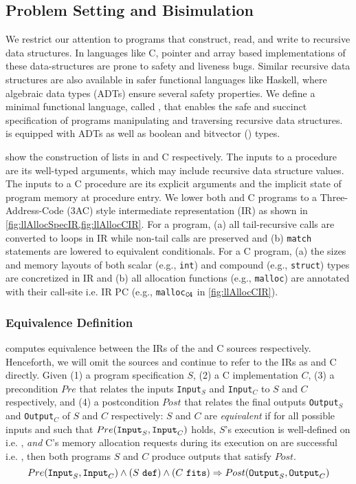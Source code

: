 \subsection{Problem Setting and Bisimulation}
\label{sec:syn-setting-bisimulation}
We restrict our attention to programs that construct, read, and write
to recursive data structures. In languages like C, pointer and array based
implementations of these data-structures are prone to safety and liveness bugs.
Similar recursive data structures are also available in safer functional languages like Haskell,
where algebraic data types (ADTs) \cite{hope} ensure several safety properties.
We define a minimal functional language, called \SpecL{}, that enables the safe
and succinct specification of programs manipulating and traversing recursive data structures.
\SpecL{} is equipped with ADTs as well as boolean and bitvector () types.



 show the construction of lists in \SpecL{} and C respectively.
The inputs to a \SpecL{} procedure are its well-typed arguments, which may include recursive data structure
values. The inputs to a C procedure are its explicit arguments and the implicit state of program memory
at procedure entry. We lower both \SpecL{} and C programs to a
Three-Address-Code (3AC) style intermediate representation (IR)
as shown in \cref{fig:llAllocSpecIR,fig:llAllocCIR}. For a \SpecL{} program,
(a) all tail-recursive calls are converted to loops in IR while non-tail calls are preserved and
(b) {\tt match} statements are lowered to equivalent \sumDtor{} conditionals.
For a C program, (a) the sizes and memory layouts of both scalar (e.g., {\tt int})
and compound (e.g., {\tt struct}) types are concretized in IR and
(b) all allocation functions (e.g., {\tt malloc}) are annotated with their
call-site i.e. IR PC (e.g., {\tt malloc$_{{\tt C4}}$} in \cref{fig:llAllocCIR}).

\subsubsection{Equivalence Definition}
\label{sec:syn-equivalence}
\toolName{} computes equivalence between the IRs of the \SpecL{} and C sources respectively.
Henceforth, we will omit the sources and continue to refer to the IRs as \SpecL{} and C directly.
Given (1) a \SpecL{} program specification $S$, (2) a C implementation $C$,
(3) a precondition $Pre$ that relates the inputs {\tt Input}$_S$ and {\tt Input}$_C$ to $S$ and $C$
respectively, and (4) a postcondition $Post$ that relates the final outputs {\tt Output}$_S$
and {\tt Output}$_C$ of $S$ and $C$ respectively:
$S$ and $C$ are {\em equivalent} if for all possible inputs  and  such that
$Pre({\tt Input}_{S},{\tt Input}_{C})$ holds,
$S$'s execution is well-defined on  i.e. \sdef{}, {\em and} C's
memory allocation requests during its execution on  are successful i.e. \cfits{},
then both programs $S$ and $C$ produce outputs
that satisfy $Post$.
$$
Pre({\tt Input}_{S},{\tt Input}_{C}) \land {(S\ {\tt def})}{} \land {(C\ {\tt fits})}{} \Rightarrow Post({\tt Output}_{S},{\tt Output}_{C})
$$


